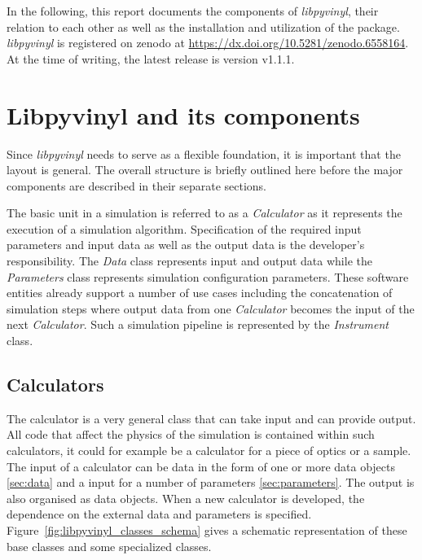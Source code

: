 \documentclass[11pt, a4paper]{article}
\begin{document}
In the following, this report documents the components of \textit{libpyvinyl}, their
relation to each other as well as the installation and utilization of the
package. \textit{libpyvinyl} is registered on zenodo at \url{https://dx.doi.org/10.5281/zenodo.6558164}. At the time of writing, the latest release is version v1.1.1. 

\section{Libpyvinyl and its components}
\label{sec:libpyvinyl}
Since \textit{libpyvinyl} needs to serve as a flexible foundation, it is
important that the layout is general. The overall structure is briefly outlined
here before the major components are described in their separate sections.

The basic unit in a simulation is referred to as a \textit{Calculator} as it
represents the execution of a simulation algorithm.
Specification of the required input parameters and input data as well as the
output data is the developer's responsibility. The \textit{Data} class
represents input and output data while the \textit{Parameters} class represents
simulation configuration parameters. These software entities already support a
number of use cases including the concatenation of simulation steps where output
data from one \textit{Calculator} becomes the input of the next
\textit{Calculator}.
Such a simulation pipeline is represented by the \textit{Instrument} class.

\subsection{Calculators}
\label{sec:calculators}
The calculator is a very general class that can take input and can provide
output. All code that affect the physics of the simulation is contained within
such calculators, it could for example be a calculator for a piece of optics or
a sample. The input of a calculator can be data in the form of one or more data
objects \ref{sec:data} and a input for a number of parameters
\ref{sec:parameters}. The output is also organised as data objects. When a new
calculator is developed, the dependence on the external data and parameters is
specified. Figure~\ref{fig:libpyvinyl_classes_schema} gives a schematic
representation of these base classes and some specialized classes. 
\end{document}
